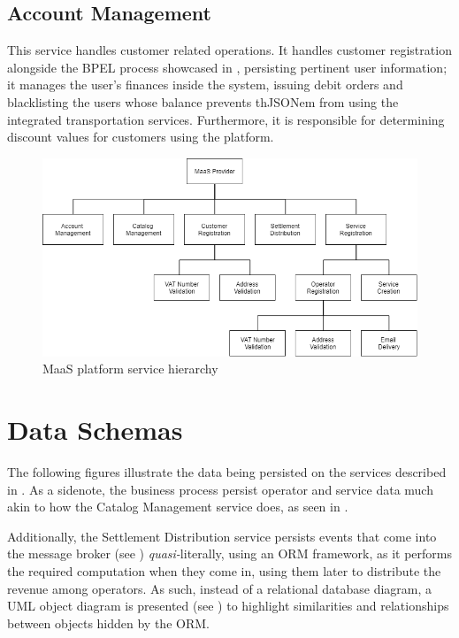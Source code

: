 \documentclass[runningheads,a4]{llncs}
\begin{document}
\subsection{Account Management}
\label{sec:services.account}
This service handles customer related operations. It handles customer
registration alongside the \ac{BPEL} process showcased in
, persisting pertinent user information; it manages the
user’s finances inside the system, issuing debit orders and blacklisting the
users whose balance prevents th\ac{JSON}em from using the integrated transportation
services. Furthermore, it is responsible for determining discount values for
customers using the platform.

\begin{figure}
  \centering
  \includegraphics[width=\textwidth]{img/service-hierarchy.png}
  \caption{\acs{MaaS} platform service hierarchy}
  \label{fig:service-hierarchy}
\end{figure}


\section{Data Schemas}
\label{sec:schemas}
The following figures illustrate the data being persisted on the services
described in . As a sidenote, the business process persist
operator and service data much akin to how the Catalog Management service does,
as seen in .

Additionally, the Settlement Distribution service persists events that come into
the message broker (see ) \emph{quasi-}literally, using an
\ac{ORM} framework, as it performs the required computation when they come in,
using them later to distribute the revenue among operators. As such, instead of
a relational database diagram, a \ac{UML} object diagram is presented (see
) to highlight similarities and relationships
between objects hidden by the \ac{ORM}.
\end{document}
